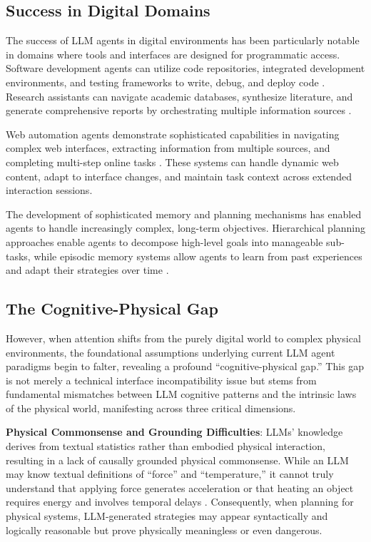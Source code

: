 \subsection{Success in Digital Domains}

The success of LLM agents in digital environments has been particularly notable in domains where tools and interfaces are designed for programmatic access. Software development agents can utilize code repositories, integrated development environments, and testing frameworks to write, debug, and deploy code \cite{nijkamp2022codegen}. Research assistants can navigate academic databases, synthesize literature, and generate comprehensive reports by orchestrating multiple information sources \cite{press2022measuring}.

Web automation agents demonstrate sophisticated capabilities in navigating complex web interfaces, extracting information from multiple sources, and completing multi-step online tasks \cite{deng2023mind2web}. These systems can handle dynamic web content, adapt to interface changes, and maintain task context across extended interaction sessions.

The development of sophisticated memory and planning mechanisms has enabled agents to handle increasingly complex, long-term objectives. Hierarchical planning approaches enable agents to decompose high-level goals into manageable sub-tasks, while episodic memory systems allow agents to learn from past experiences and adapt their strategies over time \cite{sumers2023cognitive}.

\subsection{The Cognitive-Physical Gap}

However, when attention shifts from the purely digital world to complex physical environments, the foundational assumptions underlying current LLM agent paradigms begin to falter, revealing a profound ``cognitive-physical gap.'' This gap is not merely a technical interface incompatibility issue but stems from fundamental mismatches between LLM cognitive patterns and the intrinsic laws of the physical world, manifesting across three critical dimensions.

\textbf{Physical Commonsense and Grounding Difficulties}: LLMs' knowledge derives from textual statistics rather than embodied physical interaction, resulting in a lack of causally grounded physical commonsense. While an LLM may know textual definitions of ``force'' and ``temperature,'' it cannot truly understand that applying force generates acceleration or that heating an object requires energy and involves temporal delays \cite{bisk2020experience}. Consequently, when planning for physical systems, LLM-generated strategies may appear syntactically and logically reasonable but prove physically meaningless or even dangerous.

